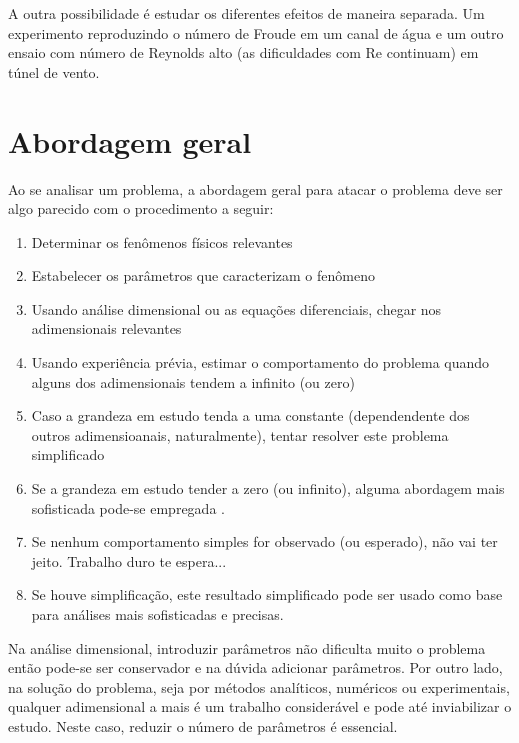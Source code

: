 A outra possibilidade é estudar os diferentes efeitos de maneira separada. Um experimento reproduzindo o número de Froude em um canal de água e um outro ensaio com número de Reynolds alto (as dificuldades com Re continuam) em túnel de vento.

  
\section{Abordagem geral}

Ao se analisar um problema, a abordagem geral para atacar o problema deve ser algo parecido com o procedimento a seguir:

\begin{enumerate}
\item Determinar os fenômenos físicos relevantes
\item Estabelecer os parâmetros que caracterizam o fenômeno
\item Usando análise dimensional ou as equações diferenciais, chegar nos adimensionais relevantes
\item Usando experiência prévia, estimar o comportamento do problema quando alguns dos adimensionais tendem a infinito (ou zero)
\item Caso a grandeza em estudo tenda a uma constante (dependendente dos outros adimensioanais, naturalmente), tentar resolver este problema simplificado
\item Se a grandeza em estudo tender a zero (ou infinito), alguma abordagem mais sofisticada pode-se empregada \cite{Barenblatt96}.
\item Se nenhum comportamento simples for observado (ou esperado), não vai ter jeito. Trabalho duro te espera...
\item Se houve simplificação, este resultado simplificado pode ser usado como base para análises mais sofisticadas e precisas.
\end{enumerate}

Na análise dimensional, introduzir parâmetros não dificulta muito o problema então pode-se ser conservador e na dúvida adicionar parâmetros. Por outro lado, na solução do problema, seja por métodos analíticos, numéricos ou experimentais, qualquer adimensional a mais é um trabalho considerável e pode até inviabilizar o estudo. Neste caso, reduzir o número de parâmetros é essencial.



